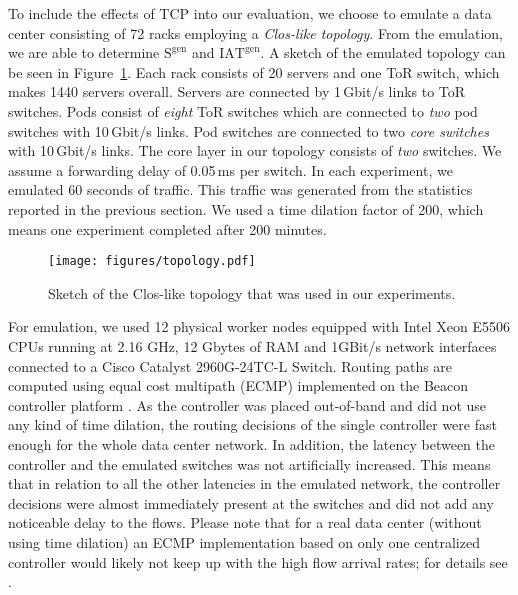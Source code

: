 \documentclass[journal,10pt]{IEEEtran}
\newcommand{\iat}[1] {\ensuremath{\mathrm{IAT}^{\mathrm{#1}}}}
\newcommand{\size}[1]{\ensuremath{\mathrm{S}  ^{\mathrm{#1}}}}
\begin{document}
To include the effects of TCP into our evaluation,
we choose to emulate a data center consisting of 72 racks employing a \emph{Clos-like topology}.
From the emulation, we are able to determine \size{gen} and \iat{gen}.
A sketch of the emulated topology can be seen in Figure~\ref{fig:clos}. 
Each rack consists of 20 servers and one ToR switch, which makes 1440 servers overall.
Servers are connected by 1\,Gbit/s links to ToR switches.
Pods consist of \emph{eight} ToR switches which are connected to \emph{two} pod switches with 10\,Gbit/s links.
Pod switches are connected to two \emph{core switches} with 10\,Gbit/s links.
The core layer in our topology consists of \emph{two} switches. We assume a forwarding delay of 0.05\,ms per switch.
In each experiment, we emulated 60 seconds of traffic. This traffic was generated from the statistics reported in the previous section.
We used a time dilation factor of 200, which means one experiment completed after 200 minutes.

		\begin{figure}
			\centering
				\texttt{[image: figures/topology.pdf]}
				\caption{Sketch of the Clos-like topology that was used in our experiments.}
				\label{fig:clos}
		\end{figure}

For emulation, we used 12 physical worker nodes equipped with Intel Xeon E5506 CPUs running at 2.16 GHz, 
12 Gbytes of RAM and 1GBit/s network interfaces
connected to a Cisco Catalyst 2960G-24TC-L Switch.
Routing paths are computed using equal cost multipath (ECMP) implemented on the Beacon controller platform \cite{erickson2013beacon}. 
As the controller was placed out-of-band 
and did not use any kind of time dilation, the routing decisions of the single controller were fast enough for the whole data center network.
In addition, the latency between the controller and the emulated switches was not artificially increased. This means that in relation to 
all the other latencies in the emulated network, the controller decisions were almost immediately present at the switches and did not 
add any noticeable delay to the flows.
Please note that for a real data center (without using time dilation) an ECMP implementation based on only one centralized controller
would likely not keep up with the high flow arrival rates; for details see \cite{wette14b}.
\end{document}

